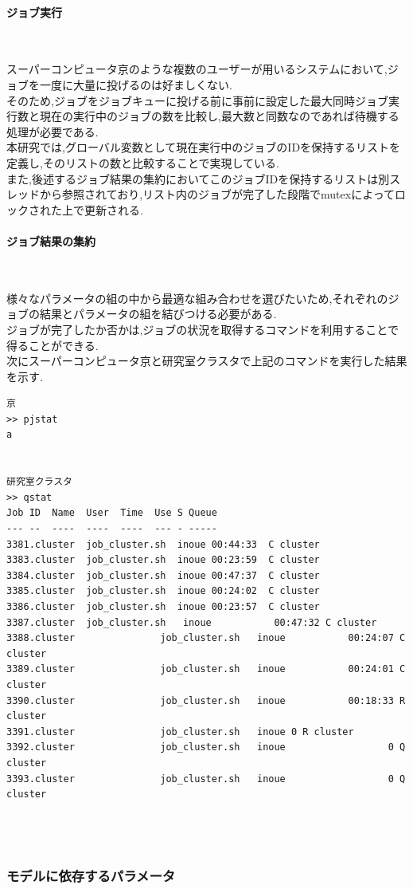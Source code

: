 \paragraph{ジョブ実行}~\\
{\footnotesize

}
スーパーコンピュータ京のような複数のユーザーが用いるシステムにおいて,ジョブを一度に大量に投げるのは好ましくない.\\
そのため,ジョブをジョブキューに投げる前に事前に設定した最大同時ジョブ実行数と現在の実行中のジョブの数を比較し,最大数と同数なのであれば待機する処理が必要である.\\
本研究では,グローバル変数として現在実行中のジョブのIDを保持するリストを定義し,そのリストの数と比較することで実現している.\\
また,後述するジョブ結果の集約においてこのジョブIDを保持するリストは別スレッドから参照されており,リスト内のジョブが完了した段階でmutexによってロックされた上で更新される.\\
\paragraph{ジョブ結果の集約}~\\
{\footnotesize

}
様々なパラメータの組の中から最適な組み合わせを選びたいため,それぞれのジョブの結果とパラメータの組を結びつける必要がある.\\
ジョブが完了したか否かは,ジョブの状況を取得するコマンドを利用することで得ることができる.\\
次にスーパーコンピュータ京と研究室クラスタで上記のコマンドを実行した結果を示す.\\
{\footnotesize
\begin{lstlisting}[numbers=none]
京
>> pjstat
a


研究室クラスタ
>> qstat
Job ID  Name  User  Time  Use S Queue
--- --  ----  ----  ----  --- - -----
3381.cluster  job_cluster.sh  inoue 00:44:33  C cluster
3383.cluster  job_cluster.sh  inoue 00:23:59  C cluster
3384.cluster  job_cluster.sh  inoue 00:47:37  C cluster
3385.cluster  job_cluster.sh  inoue 00:24:02  C cluster
3386.cluster  job_cluster.sh  inoue 00:23:57  C cluster
3387.cluster  job_cluster.sh   inoue           00:47:32 C cluster
3388.cluster               job_cluster.sh   inoue           00:24:07 C cluster
3389.cluster               job_cluster.sh   inoue           00:24:01 C cluster
3390.cluster               job_cluster.sh   inoue           00:18:33 R cluster
3391.cluster               job_cluster.sh   inoue 0 R cluster
3392.cluster               job_cluster.sh   inoue                  0 Q cluster
3393.cluster               job_cluster.sh   inoue                  0 Q cluster




\end{lstlisting}
}
\subsubsection{モデルに依存するパラメータ}
